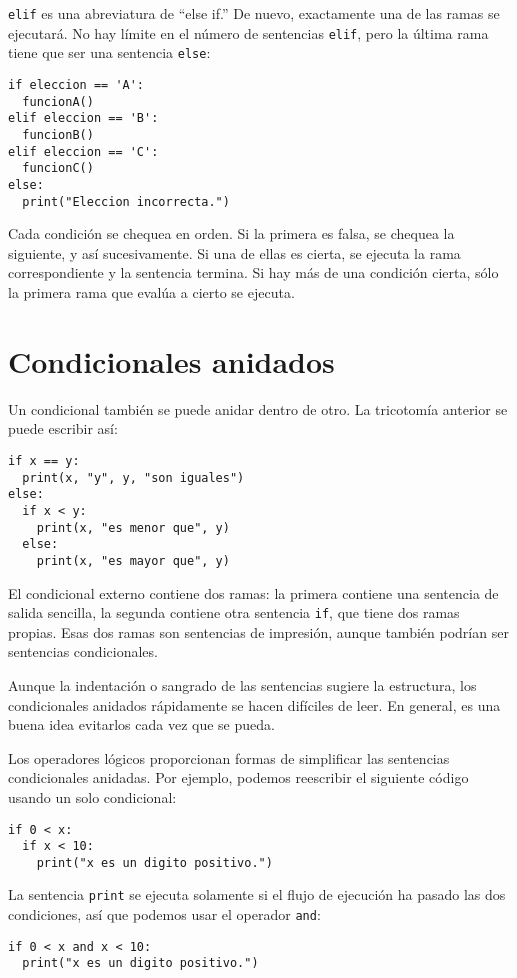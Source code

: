 \texttt{elif} es una abreviatura de ``else if.'' De nuevo, exactamente
una de las ramas se ejecutará. No hay límite en el número de sentencias
\texttt{elif}, pero la última rama tiene que ser una sentencia \texttt{else}:
\begin{lstlisting}
if eleccion == 'A':
  funcionA()
elif eleccion == 'B':
  funcionB()
elif eleccion == 'C':
  funcionC()
else:
  print("Eleccion incorrecta.")
\end{lstlisting}

Cada condición se chequea en orden. Si la primera es falsa, se chequea
la siguiente, y así sucesivamente. Si una de ellas es cierta, se ejecuta
la rama correspondiente y la sentencia termina. Si hay más de una
condición cierta, sólo la primera rama que evalúa a cierto se ejecuta.

\section{Condicionales anidados}

Un condicional también se puede anidar dentro de otro. La tricotomía
anterior se puede escribir así:

\begin{lstlisting}
if x == y:
  print(x, "y", y, "son iguales")
else:
  if x < y:
    print(x, "es menor que", y)
  else:
    print(x, "es mayor que", y)
\end{lstlisting}
 El condicional externo contiene dos ramas: la primera contiene una
sentencia de salida sencilla, la segunda contiene otra sentencia \texttt{if},
que tiene dos ramas propias. Esas dos ramas son sentencias de impresión,
aunque también podrían ser sentencias condicionales.

Aunque la indentación o sangrado de las sentencias sugiere la estructura,
los condicionales anidados rápidamente se hacen difíciles de leer.
En general, es una buena idea evitarlos cada vez que se pueda.

Los operadores lógicos proporcionan formas de simplificar las sentencias
condicionales anidadas. Por ejemplo, podemos reescribir el siguiente
código usando un solo condicional:
\begin{lstlisting}
if 0 < x:
  if x < 10:
    print("x es un digito positivo.")
\end{lstlisting}

La sentencia \texttt{print} se ejecuta solamente si el flujo de ejecución
ha pasado las dos condiciones, así que podemos usar el operador \texttt{and}:
\begin{lstlisting}
if 0 < x and x < 10:
  print("x es un digito positivo.")
\end{lstlisting}

